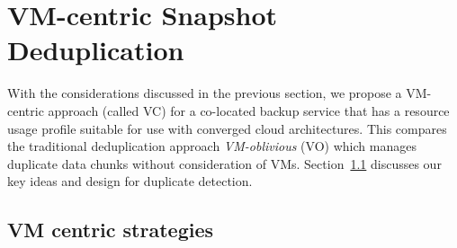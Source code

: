 \section{VM-centric Snapshot Deduplication}
\label{sect:deduplication}


With the considerations discussed in the previous section, we propose a
VM-centric approach (called VC)
for a co-located backup service that has a resource usage profile
suitable for use with converged cloud architectures.
This compares the traditional deduplication approach {\em VM-oblivious} (VO)
which manages duplicate data chunks without consideration of VMs.
Section~\ref{sect:vc-strategies} discusses  our key ideas and design for duplicate detection.

\subsection{VM centric  strategies}
\label{sect:vc-strategies}

